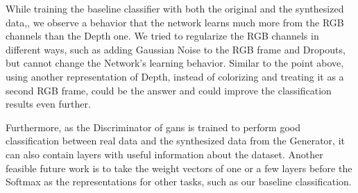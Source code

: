 While training the baseline classifier with both the original and the synthesized data,,
we observe a behavior that the network learns much more from the RGB channels than the
Depth one. We tried to regularize the RGB channels in different ways, such as adding
Gaussian Noise to the RGB frame and Dropouts, but cannot change the Network's learning
behavior. Similar to the point above, using another representation of Depth, instead of
colorizing and treating it as a second RGB frame, could be the answer and could improve
the classification results even further.

Furthermore, as the Discriminator of \acrshort{gan}s is trained to perform good
classification between real data and the synthesized data from the Generator, it can also
contain layers with useful information about the dataset. Another feasible future work is
to take the weight vectors of one or a few layers before the Softmax as the
representations for other tasks, such as our baseline classification.

